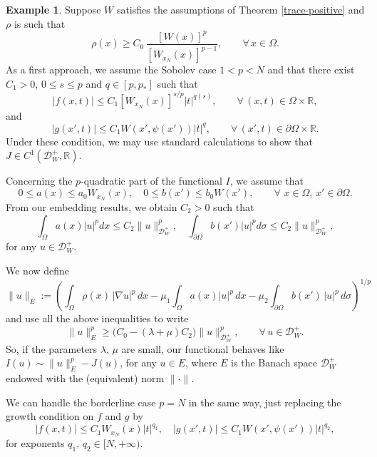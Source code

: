 \documentclass[12pt]{amsart}
\theoremstyle{definition}
\newtheorem{example}[theorem]{Example}
\theoremstyle{plain}
\begin{document}
\begin{example}\label{Example1} 
Suppose $W$ satisfies the assumptions of Theorem \ref{trace-positive} and  $\rho$ is such that
\[
\rho(x) \geq C_0\,\frac{[W(x)]^p}{[W_{x_N}(x)]^{p-1}}, 
\qquad \forall\, x \in \Omega.
\]
As a first approach, we assume the Sobolev case $1<p<N$ and that there exist $C_1>0$, $0 \leq s \leq p$ and $q \in [p,p_*]$ such that
$$
|f(x,t)| \leq C_1 [W_{x_N}(x)]^{s/p}|t|^{q(s)}, \qquad \forall \, (x,t) \in \Omega \times \mathbb{R},
$$
and
$$
|g(x',t)| \leq C_1 W(x',\psi(x'))|t|^q, \qquad \forall  \,(x',t) \in\partial\Omega \times \mathbb{R}.
$$
Under these condition, we may use standard calculations to show that $J \in C^1(\mathcal{D}_W^+,\mathbb{R})$.

Concerning the $p$-quadratic part of the functional $I$, we assume that
$$
0 \leq a(x) \leq a_0 W_{x_N}(x), \quad 0 \leq b(x')\leq b_0W(x'),\qquad \forall\, \,x\in \Omega,\, x'\in \partial\Omega.
$$
From our embedding results, we obtain $C_2>0$ such that
$$
\int_\Omega a(x) |u|^p dx \leq C_2\|u\|_{\mathcal{D}_W^+}^p, \quad \int_{\partial\Omega} b(x')|u|^p d\sigma \leq C_2\|u\|_{\mathcal{D}_W^+}^p,
$$
for any $u \in \mathcal{D}_W^+$.

We now define 
$$
\|u\|_E:= \left(  \int_\Omega \rho(x)\,|\nabla u|^p\,dx -  \mu_1 \int_\Omega a(x) |u|^p\,dx  - \mu_2 \int_{\partial\Omega} b(x')\,|u|^p\,d\sigma \right)^{1/p}
$$
and use all the above inequalities to write
$$
\|u\|_E^p \geq \Big( C_0 - (\lambda + \mu)C_2\Big) \|u\|_{\mathcal{D}_W^+}^p,\qquad \forall\, u \in \mathcal{D}_W^+.
$$
So, if the parameters $\lambda,\,\mu$ are small, our functional behaves like
$
I(u) \sim  \|u\|_E^p - J(u)$, for any $u \in E$, where $E$ is the Banach space $\mathcal{D}_W^+$ endowed with the (equivalent) norm $\|\cdot\|$.

We can handle the borderline case $p=N$ in the same way, just replacing the growth condition on $f$ and $g$ by
$$
|f(x,t)| \leq C_1 W_{x_N}(x)|t|^{q_1},\quad |g(x',t)|  \leq C_1W(x',\psi(x'))|t|^{q_2},
$$
for exponents $q_1,\,q_2 \in [N,+\infty)$.
\end{example}
\end{document}
